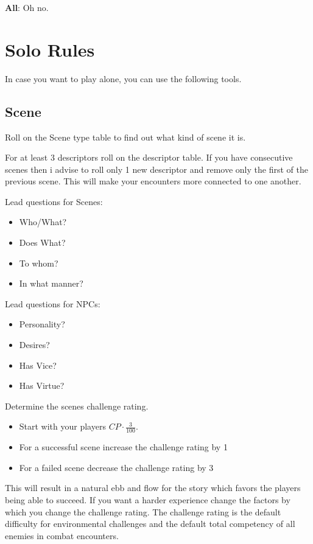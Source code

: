 \documentclass[11pt]{article}
\begin{document}
{\textbf{All}: Oh no.


\newpage
\section{Solo Rules}
\label{sec:orgcb6aa69}
In case you want to play alone, you can use the following tools.
\subsection{Scene}
\label{sec:orga0a9b12}
Roll on the Scene type table to find out what kind of scene it is.

For at least 3 descriptors roll on the descriptor table. If you have consecutive scenes then i advise to roll only 1 new descriptor and remove only the first of the previous scene. This will make your encounters more connected to one another.

\begin{multicols}{2}
Lead questions for Scenes: 
\begin{itemize}
\item Who/What?
\item Does What?
\item To whom?
\item In what manner?
\end{itemize}
\columnbreak
Lead questions for NPCs:
\begin{itemize}
\item Personality?
\item Desires?
\item Has Vice?
\item Has Virtue?
\end{itemize}
\end{multicols}

Determine the scenes challenge rating.
\begin{itemize}
\item Start with your players \(CP \cdot \frac{3}{100}\).
\item For a successful scene increase the challenge rating by 1
\item For a failed scene decrease the challenge rating by 3
\end{itemize}

This will result in a natural ebb and flow for the story which favors the players being able to succeed. If you want a harder experience change the factors by which you change the challenge rating. 
The challenge rating is the default difficulty for environmental challenges and the default total competency of all enemies in combat encounters.

}
\end{document}
